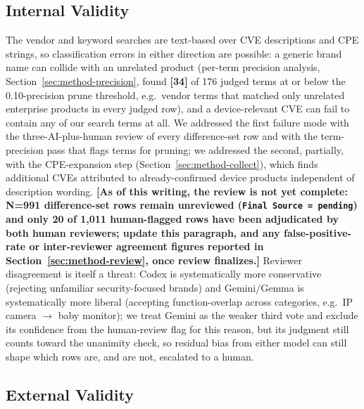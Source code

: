 \documentclass[conference]{IEEEtran}
\newcommand{\stub}[1][?]{{\color{red}\textbf{[#1]}}}
\begin{document}
\subsection{Internal Validity}
\label{sec:threats-internal}

The vendor and keyword searches are text-based over CVE descriptions and CPE strings,
so classification errors in either direction are possible: a generic brand name can
collide with an unrelated product (per-term precision analysis, Section~\ref{sec:method-precision},
found \stub[34] of 176 judged terms at or below the 0.10-precision prune threshold,
e.g.\ vendor terms that matched only unrelated enterprise products in every judged row),
and a device-relevant CVE can fail to contain any of our search terms at all. We
addressed the first failure mode with the three-AI-plus-human review of every
difference-set row and with the term-precision pass that flags terms for pruning; we
addressed the second, partially, with the CPE-expansion step (Section~\ref{sec:method-collect}),
which finds additional CVEs attributed to already-confirmed device products
independent of description wording. \stub[As of this writing, the review is not yet
complete: N=991 difference-set rows remain unreviewed (\texttt{Final Source = pending})
and only 20 of 1{,}011 human-flagged rows have been adjudicated by both human
reviewers; update this paragraph, and any false-positive-rate or inter-reviewer
agreement figures reported in Section~\ref{sec:method-review}, once review finalizes.]
Reviewer disagreement is itself a threat: Codex is systematically more conservative
(rejecting unfamiliar security-focused brands) and Gemini/Gemma is systematically more
liberal (accepting function-overlap across categories, e.g.\ IP camera $\to$ baby
monitor); we treat Gemini as the weaker third vote and exclude its confidence from the
human-review flag for this reason, but its judgment still counts toward the unanimity
check, so residual bias from either model can still shape which rows are, and are not,
escalated to a human.

\subsection{External Validity}
\label{sec:threats-external}
\end{document}
